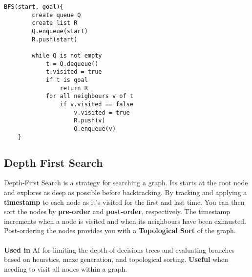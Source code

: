 \documentclass{article}
\begin{document}
	\begin{lstlisting}[style=pseudo]
	BFS(start, goal){
		create queue Q
		create list R
		Q.enqueue(start)
		R.push(start)

		while Q is not empty
			t = Q.dequeue()
			t.visited = true
			if t is goal
				return R
			for all neighbours v of t
				if v.visited == false
					v.visited = true
					R.push(v)
					Q.enqueue(v)
	}
	\end{lstlisting}






	\subsection{Depth First Search}
	Depth-First Search is a strategy for searching a graph. Its starts at the root node and explores as deep as possible before backtracking. By tracking and applying a {\bf timestamp} to each node as it's visited for the first and last time. You can then sort the nodes by {\bf pre-order} and {\bf post-order}, respectively. The timestamp increments when a node is visited and when its neighbours have been exhausted. Post-ordering the nodes provides you with a {\bf Topological Sort} of the graph.
	\\ \\
	{\bf Used in} AI for limiting the depth of decisions trees and evaluating branches based on heurstics, maze generation, and topological sorting. {\bf Useful} when needing to visit all nodes within a graph.
\end{document}
